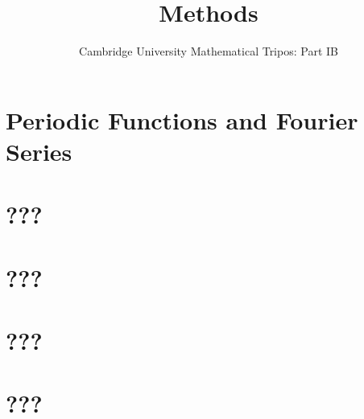 \documentclass{article}
\title{Methods}
\author{Cambridge University Mathematical Tripos: Part IB}
\begin{document}
\maketitle

\tableofcontentsnewpage{}

\section{Periodic Functions and Fourier Series}

\section{???}

\section{???}

\section{???}

\section{???}

\end{document}
